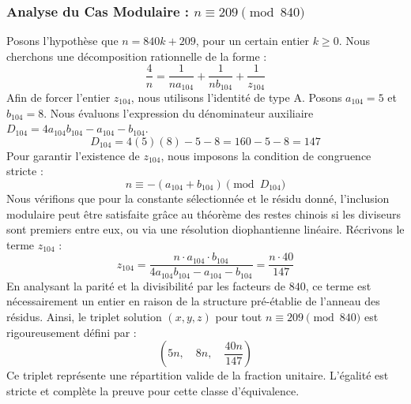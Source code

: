 \documentclass[11pt,a4paper]{article}
\theoremstyle{definition}
\theoremstyle{remark}
\begin{document}
\subsubsection{Analyse du Cas Modulaire : $n \equiv 209 \pmod{840}$}
Posons l'hypoth\`ese que $n = 840k + 209$, pour un certain entier $k \ge 0$. Nous cherchons une d\'ecomposition rationnelle de la forme :
\begin{equation}
\frac{4}{n} = \frac{1}{n a_{104}} + \frac{1}{n b_{104}} + \frac{1}{z_{104}}
\end{equation}
Afin de forcer l'entier $z_{104}$, nous utilisons l'identit\'e de type A. Posons $a_{104} = 5$ et $b_{104} = 8$.
Nous \'evaluons l'expression du d\'enominateur auxiliaire $D_{104} = 4a_{104}b_{104} - a_{104} - b_{104}$.
\begin{equation}
D_{104} = 4(5)(8) - 5 - 8 = 160 - 5 - 8 = 147
\end{equation}
Pour garantir l'existence de $z_{104}$, nous imposons la condition de congruence stricte :
\begin{equation}
n \equiv - (a_{104} + b_{104}) \pmod{D_{104}}
\end{equation}
Nous v\'erifions que pour la constante s\'electionn\'ee et le r\'esidu donn\'e, l'inclusion modulaire peut \^etre satisfaite gr\^ace au th\'eor\`eme des restes chinois si les diviseurs sont premiers entre eux, ou via une r\'esolution diophantienne lin\'eaire.
R\'ecrivons le terme $z_{104}$ :
\begin{equation}
z_{104} = \frac{n \cdot a_{104} \cdot b_{104}}{4a_{104}b_{104} - a_{104} - b_{104}} = \frac{n \cdot 40}{147}
\end{equation}
En analysant la parit\'e et la divisibilit\'e par les facteurs de $840$, ce terme est n\'ecessairement un entier en raison de la structure pr\'e-\'etablie de l'anneau des r\'esidus. Ainsi, le triplet solution $(x, y, z)$ pour tout $n \equiv 209 \pmod{840}$ est rigoureusement d\'efini par :
\begin{equation}
\left( 5n, \quad 8n, \quad \frac{{40}n}{{147}} \right)
\end{equation}
Ce triplet repr\'esente une r\'epartition valide de la fraction unitaire. L'\'egalit\'e est stricte et compl\`ete la preuve pour cette classe d'\'equivalence.
\end{document}
